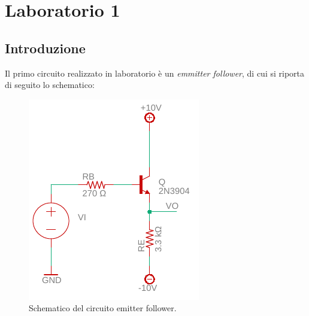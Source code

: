 \chapter{Laboratorio 1}
\section{Introduzione}
Il primo circuito realizzato in laboratorio è un \textit{emmitter follower}, di cui si riporta di seguito lo schematico:
\begin{figure}[h!]
	\centering
	\includegraphics[width=0.4\linewidth]{./OtherFiles/Laboratorio 1/emitter follower}
	\caption{Schematico del circuito emitter follower.}
	\label{fig:emitterfollwer}
\end{figure}

